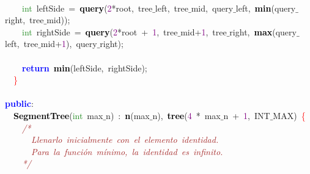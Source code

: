 {{\mbox{} \\
\mbox{}\ \ \ \ \textcolor{ForestGreen}{int}\ leftSide\ \textcolor{BrickRed}{=}\ \textbf{\textcolor{Black}{query}}\textcolor{BrickRed}{(}\textcolor{Purple}{2}\textcolor{BrickRed}{*}root\textcolor{BrickRed}{,}\ tree$\_$left\textcolor{BrickRed}{,}\ tree$\_$mid\textcolor{BrickRed}{,}\ query$\_$left\textcolor{BrickRed}{,}\ \textbf{\textcolor{Black}{min}}\textcolor{BrickRed}{(}query$\_$right\textcolor{BrickRed}{,}\ tree$\_$mid\textcolor{BrickRed}{));} \\
\mbox{}\ \ \ \ \textcolor{ForestGreen}{int}\ rightSide\ \textcolor{BrickRed}{=}\ \textbf{\textcolor{Black}{query}}\textcolor{BrickRed}{(}\textcolor{Purple}{2}\textcolor{BrickRed}{*}root\ \textcolor{BrickRed}{+}\ \textcolor{Purple}{1}\textcolor{BrickRed}{,}\ tree$\_$mid\textcolor{BrickRed}{+}\textcolor{Purple}{1}\textcolor{BrickRed}{,}\ tree$\_$right\textcolor{BrickRed}{,}\ \textbf{\textcolor{Black}{max}}\textcolor{BrickRed}{(}query$\_$left\textcolor{BrickRed}{,}\ tree$\_$mid\textcolor{BrickRed}{+}\textcolor{Purple}{1}\textcolor{BrickRed}{),}\ query$\_$right\textcolor{BrickRed}{);} \\
\mbox{} \\
\mbox{}\ \ \ \ \textbf{\textcolor{Blue}{return}}\ \textbf{\textcolor{Black}{min}}\textcolor{BrickRed}{(}leftSide\textcolor{BrickRed}{,}\ rightSide\textcolor{BrickRed}{);} \\
\mbox{}\ \ \textcolor{Red}{\}} \\
\mbox{} \\
\mbox{}\textbf{\textcolor{Blue}{public}}\textcolor{BrickRed}{:} \\
\mbox{}\ \ \textbf{\textcolor{Black}{SegmentTree}}\textcolor{BrickRed}{(}\textcolor{ForestGreen}{int}\ max$\_$n\textcolor{BrickRed}{)}\ \textcolor{BrickRed}{:}\ \textbf{\textcolor{Black}{n}}\textcolor{BrickRed}{(}max$\_$n\textcolor{BrickRed}{),}\ \textbf{\textcolor{Black}{tree}}\textcolor{BrickRed}{(}\textcolor{Purple}{4}\ \textcolor{BrickRed}{*}\ max$\_$n\ \textcolor{BrickRed}{+}\ \textcolor{Purple}{1}\textcolor{BrickRed}{,}\ INT$\_$MAX\textcolor{BrickRed}{)}\ \textcolor{Red}{\{} \\
\mbox{}\ \ \ \ \textit{\textcolor{Brown}{/*}} \\
\mbox{}\textit{\textcolor{Brown}{\ \ \ \ \ \ Llenarlo\ inicialmente\ con\ el\ elemento\ identidad.}} \\
\mbox{}\textit{\textcolor{Brown}{\ \ \ \ \ \ Para\ la\ función\ mínimo,\ la\ identidad\ es\ infinito.}} \\
\mbox{}\textit{\textcolor{Brown}{\ \ \ \ */}} \\
}}
